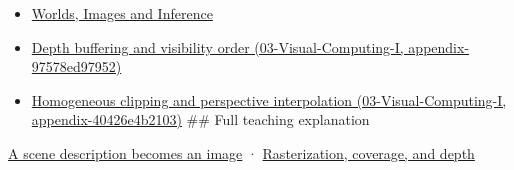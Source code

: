 \begin{itemize}
\item
  \href{Continuous\%20Notes/University\%20-\%20Worlds,\%20Images\%20and\%20Inference\%20-\%20Graphics,\%20Vision\%20and\%20Photography}{Worlds, Images and Inference}
\item
  \href{}{Depth buffering and visibility order (03-Visual-Computing-I, appendix-97578ed97952)}
\item
  \href{}{Homogeneous clipping and perspective interpolation (03-Visual-Computing-I, appendix-40426e4b2103)} \#\# Full teaching explanation
\end{itemize}

\href{Continuous\%20Notes/University\%20-\%20Worlds,\%20Images\%20and\%20Inference\%20-\%20Graphics,\%20Vision\%20and\%20Photography\#A\%20scene\%20description\%20becomes\%20an\%20image}{A scene description becomes an image} · \href{Continuous\%20Notes/University\%20-\%20Worlds,\%20Images\%20and\%20Inference\%20-\%20Graphics,\%20Vision\%20and\%20Photography\#Rasterization,\%20coverage,\%20and\%20depth}{Rasterization, coverage, and depth}
